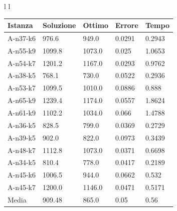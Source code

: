 \documentclass[]{article}
\begin{document}
\begin{tabular}{l l}
	\begin{tabular}{||l | l l l l||} 
		\hline
		Istanza & Soluzione & Ottimo & Errore & Tempo \\ [0.5ex] 
		\hline\hline
		A-n37-k6 & \cellcolor{green} 976.6 & 949.0 & 0.0291 & 0.2943  \\
		A-n55-k9 & \cellcolor{green} 1099.8 & 1073.0 & 0.025 & 1.0653  \\
		A-n54-k7 & \cellcolor{green} 1201.2 & 1167.0 & 0.0293 & 0.9762  \\
		A-n38-k5 & \cellcolor{green} 768.1 & 730.0 & 0.0522 & 0.2936  \\
		A-n53-k7 & 1099.5 & 1010.0 & 0.0886 & 0.888  \\
		A-n65-k9 & \cellcolor{green} 1239.4 & 1174.0 & 0.0557 & 1.8624  \\
		A-n61-k9 & 1102.2 & 1034.0 & 0.066 & 1.4788  \\		
		A-n36-k5 & \cellcolor{green}828.5 & 799.0 & 0.0369 & 0.2729  \\
		A-n39-k5 & \cellcolor{green}902.0 & 822.0 & 0.0973 & 0.3439  \\
		A-n48-k7 & 1112.8 & 1073.0 & 0.0371 & 0.6698  \\
		A-n34-k5 & 810.4 & 778.0 & 0.0417 & 0.2189  \\
		A-n45-k6 & 1006.5 & 944.0 & 0.0662 & 0.532  \\
		A-n45-k7 & 1200.0 & 1146.0 & 0.0471 & 0.5171  \\
		\hline
		Media & 909.48 & 865.0 & 0.05 & 0.56  \\
		[1ex] 
		\hline
	\end{tabular}


\end{tabular}


\space
\end{document}

